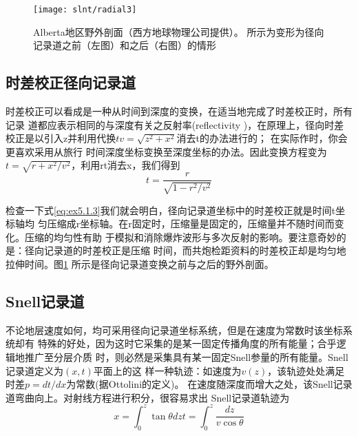 \begin{figure}[H]
\centering
\texttt{[image: slnt/radial3]}
\caption[radial3]{Alberta地区野外剖面（西方地球物理公司提供）。
所示为变形为径向记录道之前（左图）和之后（右图）的情形}
\label{fig:slnt/radial3}
\end{figure}

\subsection{时差校正径向记录道}
\label{sec:5.1.1}

时差校正可以看成是一种从时间到深度的变换，在适当地完成了时差校正时，所有记录
道都应表示相同的与深度有关之反射率(reflectivity
)，在原理上，径向时差校正是以引入z并利用代换$tv=\sqrt{z^2+x^2}$消去t的办法进行的；
在实际作时，你会更喜欢采用从旅行
时间深度坐标变换至深度坐标的办法。因此变换方程变为
$t=\sqrt{r+x^2/v^2}$，利用rt消去x，我们得到
\begin{equation}
t=\frac{r}{\sqrt{1-r^2/v^2}}
\label{eq:ex5.1.3}
\end{equation}

检查一下式\ref{eq:ex5.1.3}我们就会明白，径向记录道坐标中的时差校正就是时间t坐标轴均
匀压缩成r坐标轴。在r固定时，压缩量是固定的，压缩量并不随时间而变化。压缩的均匀性有助
于模拟和消除爆炸波形与多次反射的影响。要注意奇妙的是：径向记录道的时差校正是压缩
时间，而共炮检距资料的时差校正却是均匀地拉伸时间。图\ref{fig:slnt/radial3}
所示是径向记录道变换之前与之后的野外剖面。

\subsection{Snell记录道}
\label{sec:5.1.2}

不论地层速度如何，均可采用径向记录道坐标系统，但是在速度为常数时该坐标系统却有
特殊的好处，因为这时它采集的是某一固定传播角度的所有能量；合乎逻辑地推广至分层介质
时，则必然是采集具有某一固定Snell参量的所有能量。Snell记录道定义为$(x,t)$平面上的这
样一种轨迹：如速度为$v(z)$，该轨迹处处满足时差$p=dt/dx$为常数(据Ottolini的定义)。
在速度随深度而增大之处，该Snell记录道弯曲向上。对射线方程进行积分，很容易求出
Snell记录道轨迹为
\begin{subequations}
\begin{equation}
x=\int_0^z\tan\theta dz
\label{eq:ex5.1.4a}
\end{equation}
\begin{equation}
t=\int_0^z \frac{dz}{v\cos\theta}
\label{eq:ex5.1.4b}
\end{equation}
\label{eq:ex5.1.4}
\end{subequations}

